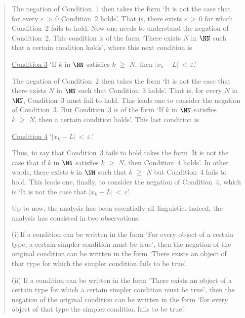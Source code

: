 \begin{quotation}
{\noindent The negation of Condition~1 then takes the form `It is not the case that for every ${\varepsilon}\,>\,0$ Condition~2 holds'.
    That is, there exists ${\varepsilon}\,>\,0$ for which Condition~2 fails to hold.
    Now one needs to understand the negation of Condition~2. This condition is of the form `There exists $N$ in ${\NN}$ such that a certain condition holds', where this next condition is

\VA

        \h \underline{Condition 3} `If $k$ in ${\NN}$
    satisfies $k\,\,{\geq}\,\,N$, then $|x_{k}-L|\,<\,{\varepsilon}$.'

\VA

\noindent The negation of Condition~2 then takes the form `It is not the case that there exists $N$ in ${\NN}$ such that Condition~3 holds'.
    That is, for every $N$ in ${\NN}$, Condition~3 must fail to hold. This leads one to consider the negation of Condition~3.
    But Condition~3 is of the form `If $k$ in ${\NN}$ satisfies $k\,\,{\geq}\,\,N$, then a certain condition holds'. This last condition is

\VA

        \h \underline{Condition 4} `$|x_{k}-L|\,<\,{\varepsilon}$.'

\VA

\noindent Thus, to say that Condition~3 fails to hold takes the form `It is not the case that if $k$ in ${\NN}$ satisfies $k\,\,{\geq}\,\,N$,
    then Condition~4 holds'. In other words, there exists $k$ in ${\NN}$ such that $k\,\,{\geq}\,\,N$ but Condition~4 fails to hold.
    This leads one, finally, to consider the negation of Condition~4, which is `It is not the case that $|x_{k}-L|\,<\,{\varepsilon}$'.

        Up to now, the analysis has been essentially all linguistic. Indeed, the analysis has consisted in two observations:

\VA

        \h (i)\,If a condition can be written in the form `For every object of a certain type,
    a certain simpler condition must be true',
    then the negation of the original condition can be written in the form `There exists an object of that type for which the simpler condition fails to be true'.

        \h (ii) If a condition can be written in the form `There exists an object of a certain type for which a certain simpler condition must be true', 
    then the negation of the original condition can be written in the form `For every object of that type the simpler condition fails to be true'.

}
\end{quotation}
